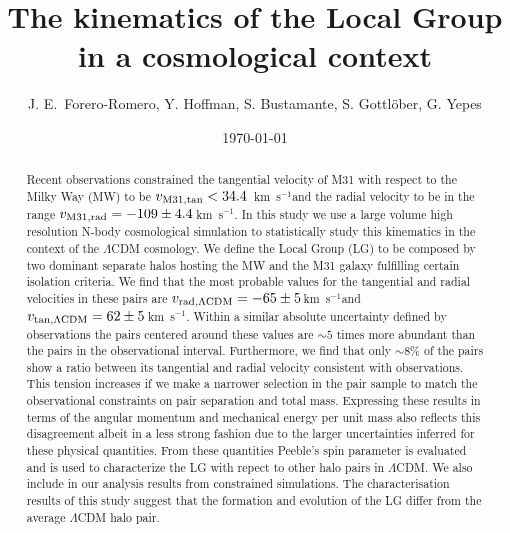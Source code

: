 \documentclass{emulateapj}
\newcommand{\kms}{\,km~s$^{-1}$}
\begin{document}
\title{The kinematics of the Local Group in a cosmological context}
\author{
J. E.\ Forero-Romero, 
Y. Hoffman, 
S. Bustamante, 
S. Gottl\"ober, 
G. Yepes
}


\date{\today}

\begin{abstract}
   
Recent observations constrained the tangential velocity of M31 with respect to the Milky Way (MW) to be $v_{\rm M31,tan}<34.4$ \kms and the radial velocity to be in the range $v_{\rm M31,rad}=-109\pm 4.4$\kms \citep{vanderMarel12}. In this study we use a large volume high resolution N-body cosmological simulation to statistically study this kinematics in the context of the $\Lambda$CDM cosmology. We define the Local Group (LG) to be composed by two dominant separate halos hosting the MW and the M31 galaxy fulfilling certain isolation criteria. We find that the most probable values for the tangential and radial velocities in these pairs are $v_{\rm rad, \Lambda CDM}=-65\pm 5$\kms and $v_{\rm tan, \Lambda CDM}=62\pm 5$\kms. Within a similar absolute uncertainty defined by observations the pairs centered around these values are $\sim5$ times more abundant than the pairs in the observational interval. Furthermore, we find that only $\sim8\%$ of the pairs show a ratio between its tangential and radial velocity consistent with observations. This tension increases if we make a narrower selection in the pair sample to match the observational constraints on pair separation and total mass. Expressing these results in terms of the angular momentum and mechanical energy per unit mass also reflects this disagreement albeit in a less strong fashion due to the larger uncertainties inferred for these physical quantities. From these quantities Peeble's spin parameter is evaluated and is used to characterize the LG with repect to other halo pairs in $\Lambda$CDM. We also include in our analysis results from constrained simulations. The characterisation results of this study suggest that the formation and evolution of the LG differ from the average $\Lambda$CDM halo pair.
\end{abstract}
\end{document}
